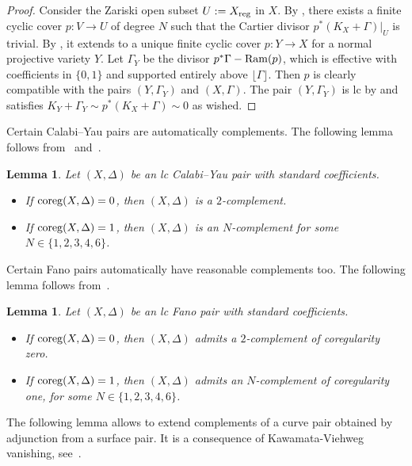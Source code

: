 \documentclass{amsart}
\newtheorem{lemma}[theorem]{Lemma}
\theoremstyle{definition}
\theoremstyle{remark}
\numberwithin{equation}{section}
\begin{document}
\begin{proof}
    Consider the Zariski open subset %
    $U := X_{\rm reg}$ in $X$. By \cite[Proposition 4.1.6]{Laz04a}, there exists a finite cyclic cover $p:V\to U$ of degree $N$ such that the Cartier divisor $p^*(K_X+\Gamma)|_U$ is trivial.
    By \cite[Theorem 3.5]{DG94}, it extends to a unique finite cyclic cover $p:Y\to X$ for a normal projective variety $Y$. Let $\Gamma_Y$ be the divisor $p^*\Gamma- {\rm Ram}(p)$, which is effective with coefficients in $\{0,1\}$ and supported entirely above $\lfloor\Gamma\rfloor$. 
    Then $p$ is clearly compatible with the pairs $(Y,\Gamma_Y)$ and $(X,\Gamma)$. The pair $(Y,\Gamma_Y)$ is lc by \cite[Proposition 5.20]{KM98} and satisfies $K_Y+\Gamma_Y\sim p^*(K_X+\Gamma)\sim 0$ as wished.
\end{proof}

Certain Calabi--Yau pairs are automatically complements. 
The following lemma follows from~\cite[Corollary 3]{FMM22} and~\cite[Theorem 3]{FFMP22}.

\begin{lemma}\label{lem:coreg-vs-complementCY}
Let $(X,\Delta)$ be an lc Calabi--Yau pair with standard coefficients.
\begin{itemize}
\item If ${\rm coreg}(X,\Delta)=0$, then
$(X,\Delta)$ is a $2$-complement.
\item If ${\rm coreg}(X,\Delta)=1$, then $(X,\Delta)$ is an $N$-complement for some $N\in \{1,2,3,4,6\}$.
\end{itemize}
\end{lemma}

Certain Fano pairs automatically have reasonable complements too. The following lemma follows from~\cite[Theorems 4 and 5]{FFMP22}.

\begin{lemma}\label{lem:coreg-vs-complementFano}
Let $(X,\Delta)$ be an lc Fano pair with standard coefficients.
\begin{itemize}
\item If ${\rm coreg}(X,\Delta)=0$, then
$(X,\Delta)$ admits a $2$-complement of coregularity zero.
\item If ${\rm coreg}(X,\Delta)=1$, then $(X,\Delta)$ admits an $N$-complement of coregularity one, for some $N\in \{1,2,3,4,6\}$.
\end{itemize}
\end{lemma}

The following lemma allows to extend complements of a curve pair obtained by adjunction from a surface pair. It is a consequence of Kawamata-Viehweg vanishing, see~\cite[Proposition 6.7]{Bir19}.
\end{document}
